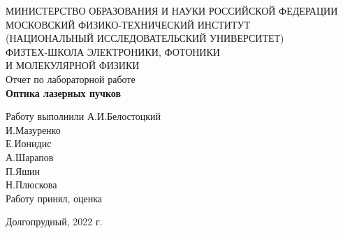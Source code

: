 \documentclass[a4paper,12pt]{article}
\begin{document}
 

\begin{titlepage}
	\begin{center}
		\large 	МИНИСТЕРСТВО ОБРАЗОВАНИЯ И НАУКИ РОССИЙСКОЙ ФЕДЕРАЦИИ\\
				МОСКОВСКИЙ ФИЗИКО-ТЕХНИЧЕСКИЙ ИНСТИТУТ \\
				(НАЦИОНАЛЬНЫЙ ИССЛЕДОВАТЕЛЬСКИЙ УНИВЕРСИТЕТ)\\ 
				ФИЗТЕХ-ШКОЛА ЭЛЕКТРОНИКИ, ФОТОНИКИ \\
				И МОЛЕКУЛЯРНОЙ ФИЗИКИ \\
		
		
		\vspace{4.0 cm}
		\LARGE{Отчет по лабораторной работе} \\ 
		\LARGE \textbf{Оптика лазерных пучков} \\
	\end{center}
	\vspace{3 cm} \large

	\begin{flushleft}
		Работу выполнили \hspace{5.5cm}  \underline{\hspace{3cm}} А.И.Белостоцкий \\	
		\hspace{9.8cm}  \underline{\hspace{3cm}} И.Мазуренко \\
		\hspace{9.8cm}  \underline{\hspace{3cm}} Е.Ионидис \\
		\hspace{9.8cm}  \underline{\hspace{3cm}} А.Шарапов \\
		\hspace{9.8cm}  \underline{\hspace{3cm}} П.Яшин \\
		\hspace{9.8cm}  \underline{\hspace{3cm}} Н.Плюскова \\
		\vspace{2cm}
		Работу принял, оценка \hspace{4.3cm} \underline{\hspace{3cm}}
	\end{flushleft}
	
	
	\vfill

	\begin{center}
	Долгопрудный, 2022 г.
	\end{center}
\end{titlepage}           
\end{document}
